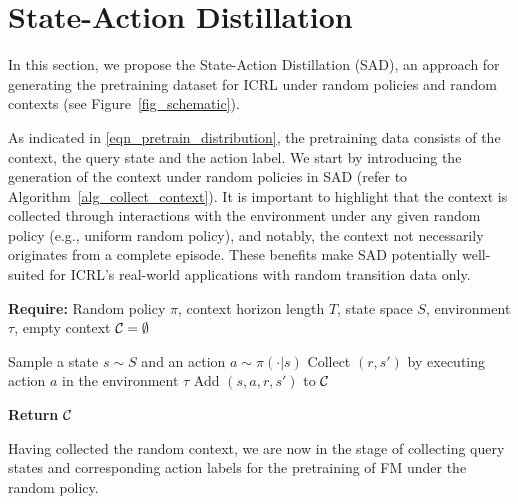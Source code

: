 %
%
\section{State-Action Distillation}


In this section, we propose the State-Action Distillation (SAD), an approach for generating the pretraining dataset for ICRL under random policies and random contexts (see Figure~\ref{fig_schematic}).


As indicated in \eqref{eqn_pretrain_distribution}, the pretraining data consists of the context, the query state and the action label. We start by introducing the generation of the context under random policies in SAD (refer to Algorithm~\ref{alg_collect_context}).
%
It is important to highlight that the context is collected through interactions with the environment under any given random policy (e.g., uniform random policy), and notably, the context not necessarily originates from a complete episode. 
%
These benefits make SAD potentially well-suited for ICRL's real-world applications with random transition data only.
%
\begin{algorithm}
\caption{Collecting Contexts under Random Policy}         \label{alg_collect_context}
\begin{algorithmic}[1]
		\STATE \textbf{Require:} Random policy $\pi$, context horizon length $T$, state space $S$, environment $\tau$, empty context ${\mathcal C} = \emptyset$

            \STATE Sample a state $s \sim S$ and an action $a \sim \pi(\cdot | s)$
            \STATE Collect $(r, s')$ by executing action $a$ in the environment $\tau$
            \STATE Add $(s, a, r, s')$ to ${\mathcal C}$

        \ENDFOR
        \STATE \textbf{Return} ${\mathcal C}$

\end{algorithmic}
\end{algorithm}
%
%
Having collected the random context, we are now in the stage of collecting query states and corresponding action labels for the pretraining of FM under the random policy.


